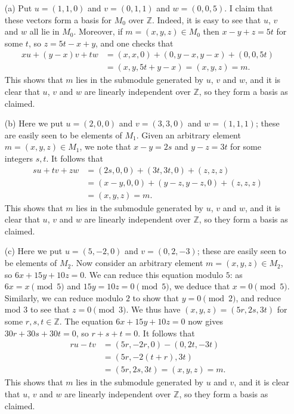 \documentclass{amsart}
\newcommand{\Z}         {{\mathbb{Z}}}
\renewcommand{\:}{\colon}
\theoremstyle{definition}
\renewenvironment{solution}{\SolutionAtEnd}{\endSolutionAtEnd}
\begin{document}
\begin{solution}
 \begin{itemize}
  \item[(a)] Put $u=(1,1,0)$ and $v=(0,1,1)$ and $w=(0,0,5)$.  I claim
   that these vectors form a basis for $M_0$ over $\Z$.  Indeed, it is
   easy to see that $u$, $v$ and $w$ all lie in $M_0$.  Moreover, if
   $m=(x,y,z)\in M_0$ then $x-y+z=5t$ for some $t$, so $z=5t-x+y$, and
   one checks that 
   \begin{align*}
    xu+(y-x)v+tw &= (x,x,0) + (0,y-x,y-x) + (0,0,5t) \\
                 &= (x,y,5t+y-x) = (x,y,z) = m.
   \end{align*}
   This shows that $m$ lies in the submodule generated by $u$, $v$ and
   $w$, and it is clear that $u$, $v$ and $w$ are linearly independent
   over $\Z$, so they form a basis as claimed.
  \item[(b)] Here we put $u=(2,0,0)$ and $v=(3,3,0)$ and $w=(1,1,1)$;
   these are easily seen to be elements of $M_1$.  Given an arbitrary
   element $m=(x,y,z)\in M_1$, we note that $x-y=2s$ and $y-z=3t$ for
   some integers $s,t$.  It follows that
   \begin{align*}
    su + tv + zw &= (2s,0,0) + (3t,3t,0) + (z,z,z) \\
                 &= (x-y,0,0) + (y-z,y-z,0) + (z,z,z) \\
                 &= (x,y,z) = m.
   \end{align*}
   This shows that $m$ lies in the submodule generated by $u$, $v$ and
   $w$, and it is clear that $u$, $v$ and $w$ are linearly independent
   over $\Z$, so they form a basis as claimed.
  \item[(c)] Here we put $u=(5,-2,0)$ and $v=(0,2,-3)$; these are
   easily seen to be elements of $M_2$.  Now consider an arbitrary
   element $m=(x,y,z)\in M_2$, so $6x+15y+10z=0$.  We can reduce this
   equation modulo $5$: as $6x=x\pmod{5}$ and $15y=10z=0\pmod{5}$, we
   deduce that $x=0\pmod{5}$.  Similarly, we can reduce modulo $2$ to
   show that $y=0\pmod{2}$, and reduce mod $3$ to see that
   $z=0\pmod{3}$.  We thus have $(x,y,z)=(5r,2s,3t)$ for some
   $r,s,t\in\Z$.  The equation $6x+15y+10z=0$ now gives
   $30r+30s+30t=0$, so $r+s+t=0$.  It follows that
   \begin{align*}
    ru-tv &= (5r,-2r,0) - (0,2t,-3t) \\
          &= (5r,-2(t+r),3t) \\
          &= (5r,2s,3t) = (x,y,z) = m.
   \end{align*}
   This shows that $m$ lies in the submodule generated by $u$ and $v$,
   and it is clear that $u$, $v$ and $w$ are linearly independent over
   $\Z$, so they form a basis as claimed.
 \end{itemize}
\end{solution}
\end{document}
